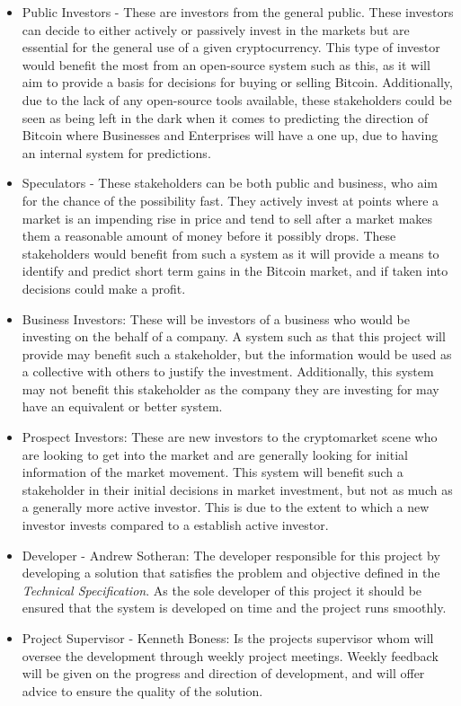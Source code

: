 \documentclass[oneside, 12pt]{article}
\begin{document}
		\begin{itemize}
			\item Public Investors - These are investors from the general public. These investors can decide to either actively or passively invest in the markets but are essential for the general use of a given cryptocurrency. This type of investor would benefit the most from an open-source system such as this, as it will aim to provide a basis for decisions for buying or selling Bitcoin. Additionally, due to the lack of any open-source tools available, these stakeholders could be seen as being left in the dark when it comes to predicting the direction of Bitcoin where Businesses and Enterprises will have a one up, due to having an internal system for predictions.
			\item Speculators - These stakeholders can be both public and business, who aim for the chance of the possibility fast. They actively invest at points where a market is an impending rise in price and tend to sell after a market makes them a reasonable amount of money before it possibly drops. These stakeholders would benefit from such a system as it will provide a means to identify and predict short term gains in the Bitcoin market, and if taken into decisions could make a profit.
			\item Business Investors: These will be investors of a business who would be investing on the behalf of a company. A system such as that this project will provide may benefit such a stakeholder, but the information would be used as a collective with others to justify the investment. Additionally, this system may not benefit this stakeholder as the company they are investing for may have an equivalent or better system.
			\item Prospect Investors: These are new investors to the cryptomarket scene who are looking to get into the market and are generally looking for initial information of the market movement. This system will benefit such a stakeholder in their initial decisions in market investment, but not as much as a generally more active investor. This is due to the extent to which a new investor invests compared to a establish active investor.
			
			\item Developer - Andrew Sotheran: The developer responsible for this project by developing a solution that satisfies the problem and	objective defined in the \textit{Technical Specification}. As the sole developer of this project it should be ensured that the system is developed on time and the project runs smoothly.
			\item Project Supervisor - Kenneth Boness: Is the projects supervisor whom will oversee the development through weekly project meetings. Weekly feedback will be given on the progress and direction of development, and will offer advice to ensure the quality of the solution.
		\end{itemize}
		
\end{document}
